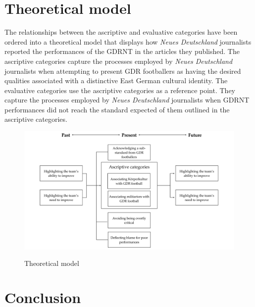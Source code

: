 \section*{Theoretical model}

The relationships between the ascriptive and evaluative categories have been ordered into a theoretical model that displays how \textit{Neues Deutschland} journalists reported the performances of the GDRNT in the articles they published. The ascriptive categories capture the processes employed by \textit{Neues Deutschland} journalists when attempting to present GDR footballers as having the desired qualities associated with a distinctive East German cultural identity. The evaluative categories use the ascriptive categories as a reference point. They capture the processes employed by \textit{Neues Deutschland} journalists when GDRNT performances did not reach the standard expected of them outlined in the ascriptive categories.

\begin{figure}[h]
\caption{Theoretical model}
\includegraphics[width=\textwidth]{mres/images/figure 4.1.pdf}
\centering
\label{fig:fig4.1}
\end{figure}

\section*{Conclusion}

